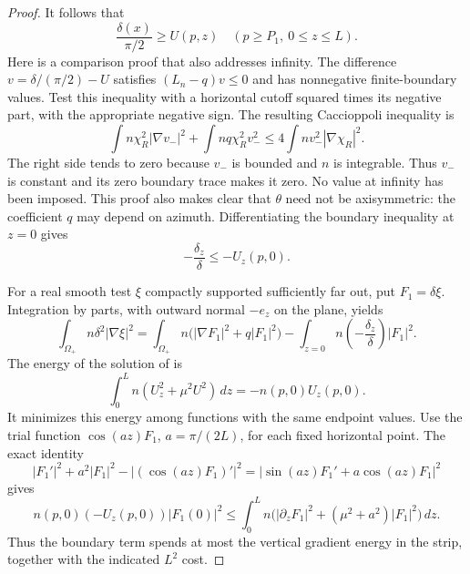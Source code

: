 \begin{proof}
It follows that
\begin{equation}\label{eq:strip-angle-comparison}
 \frac{\delta(x)}{\pi/2}\ge U(p,z)
       \quad(p\ge P_1,\ 0\le z\le L).
\end{equation}
Here is a comparison proof that also addresses infinity.
The difference \(v=\delta/(\pi/2)-U\) satisfies
\((L_n-q)v\le0\) and has nonnegative finite-boundary values.
Test this inequality with a horizontal cutoff squared times its
negative part, with the appropriate negative sign.
The resulting Caccioppoli inequality is
\[
 \int n\chi_R^2|\nabla v_-|^2
       +\int nq\chi_R^2v_-^2
       \le4\int n v_-^2|\nabla\chi_R|^2.
\]
The right side tends to zero because \(v_-\) is bounded and \(n\)
is integrable.  Thus \(v_-\) is constant and its zero boundary trace
makes it zero.  No value at infinity has been imposed.
This proof also makes clear that \(\theta\) need not be axisymmetric:
the coefficient \(q\) may depend on azimuth.
Differentiating the boundary inequality at \(z=0\) gives
\begin{equation}\label{eq:strip-flux-bound}
 -\frac{\delta_z}{\delta}\le-U_z(p,0).
\end{equation}

For a real smooth test \(\xi\) compactly supported sufficiently far
out, put \(F_1=\delta\xi\).  Integration by parts, with outward
normal \(-e_z\) on the plane, yields
\begin{equation}\label{eq:delta-transform-boundary}
 \int_{\Omega_+}n\delta^2|\nabla\xi|^2
 =\int_{\Omega_+}n\bigl(|\nabla F_1|^2+q|F_1|^2\bigr)
  -\int_{z=0}n\left(-\frac{\delta_z}{\delta}\right)|F_1|^2.
\end{equation}
The energy of the solution of  is
\[
 \int_0^L n(U_z^2+\mu^2U^2)\,dz=-n(p,0)U_z(p,0).
\]
It minimizes this energy among functions with the same endpoint
values.  Use the trial function
\(\cos(az)F_1\), \(a=\pi/(2L)\), for each fixed horizontal point.
The exact identity
\[
 |F_1'|^2+a^2|F_1|^2
       -|(\cos(az)F_1)'|^2
       =|\sin(az)F_1'+a\cos(az)F_1|^2
\]
gives
\begin{equation}\label{eq:strip-boundary-cost}
 n(p,0)(-U_z(p,0))|F_1(0)|^2
 \le\int_0^L n\bigl(
        |\partial_zF_1|^2+(\mu^2+a^2)|F_1|^2\bigr)\,dz.
\end{equation}
Thus the boundary term spends at most the vertical gradient energy
in the strip, together with the indicated \(L^2\) cost.


\end{proof}
